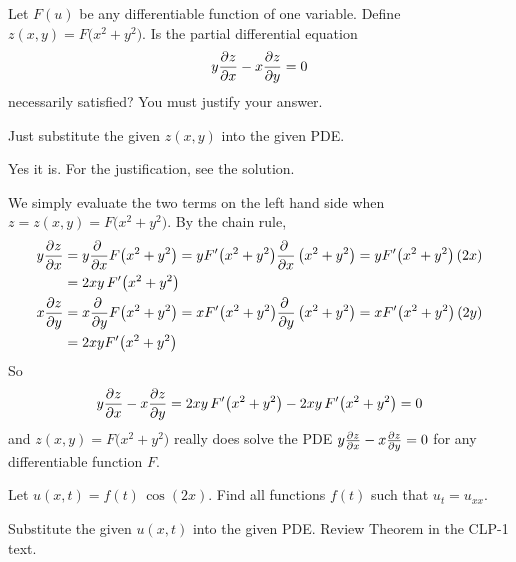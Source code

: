 \begin{question}
Let $F(u)$ be any differentiable function of one variable. Define
$z(x,y)=F\big(x^2+y^2\big)$. Is the partial differential equation
\begin{equation*}
y\pdiff{z}{x} - x\pdiff{z}{y}=0
\end{equation*}
necessarily satisfied? You must justify your answer.
\end{question}

\begin{hint}
Just substitute the given $z(x,y)$ into the given PDE.
\end{hint}

\begin{answer}
Yes it is. For the justification, see the solution.
\end{answer}

\begin{solution}
We simply evaluate the two terms on the left hand side  when 
$z=z(x,y)=F\big(x^2+y^2\big)$. By the chain rule,
\begin{align*}
y\pdiff{z}{x}&= y\pdiff{}{x}F\big(x^2+y^2\big)
=yF'\big(x^2+y^2\big) \pdiff{}{x}\,\big(x^2+y^2\big)
=yF'\big(x^2+y^2\big)\left(2x\right) \\
&=2xy\,F'\big(x^2+y^2\big)
\\
x\pdiff{z}{y}&= x\pdiff{}{y}F\big(x^2+y^2\big)
=xF'\big(x^2+y^2\big)  \pdiff{}{y}\,\big(x^2+y^2\big)
=xF'\big(x^2+y^2\big)\left(2y\right) \\
&=2xyF'\big(x^2+y^2\big)
\end{align*}
So
\begin{equation*}
y\pdiff{z}{x} - x\pdiff{z}{y}
=2xy\,F'\big(x^2+y^2\big) - 2xy\,F'\big(x^2+y^2\big) 
=0
\end{equation*}
and 
$z(x,y)=F\big(x^2+y^2\big)$ really does solve the PDE
$
y\pdiff{z}{x} - x\pdiff{z}{y}=0
$
for any differentiable function $F$.
\end{solution}


\begin{question}
Let $u(x,t) = f(t)\,\cos(2x)$. Find all functions $f(t)$ such that 
$u_{t} = u_{xx}$.
\end{question}

\begin{hint}
Substitute the given $u(x,t)$ into the given PDE.
Review Theorem  in the CLP-1 text.
\end{hint}

